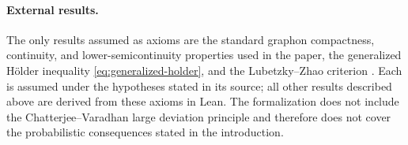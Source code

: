 \paragraph{External results.}
The only results assumed as axioms are the standard graphon
compactness, continuity, and lower-semicontinuity properties used in the paper,
the generalized H\"older inequality \eqref{eq:generalized-holder}, and
the Lubetzky--Zhao criterion .
Each is assumed under the hypotheses stated in its source; all other results
described above are derived from these axioms in Lean.
The formalization does not include the Chatterjee--Varadhan large deviation
principle and therefore does not cover the probabilistic consequences stated in
the introduction.
